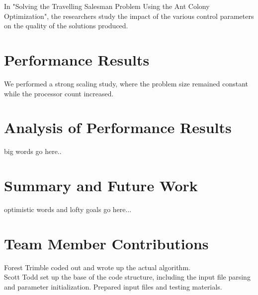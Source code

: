 \documentclass[twocolumn]{article}
\begin{document}
In "Solving the Travelling Salesman Problem Using the Ant Colony Optimization", 
the researchers study the impact of the various control parameters on the 
quality of the solutions produced. \\


\section{Performance Results}

We performed a strong scaling study, where the problem size remained constant
while the processor count increased.\\


\section{Analysis of Performance Results}

big words go here..\\


\section{Summary and Future Work}

optimistic words and lofty goals go here...\\

\section{Team Member Contributions}

\noindent Forest Trimble coded out and wrote up the actual algorithm.  \\

\noindent Scott Todd set up the base of the code structure, including the input
file parsing and parameter initialization. Prepared input files and testing
materials.

\nocite{*}


\end{document}

